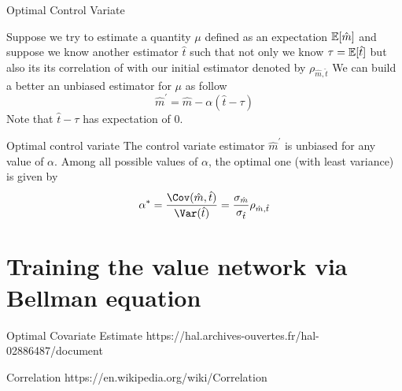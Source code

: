 \documentclass{article}
\begin{document}
Optimal Control Variate

Suppose we try to estimate a quantity $\mu$ defined as an expectation
$\mathbb{E}[\hat m]$ and suppose we know another estimator $\hat t$ such 
that not only we know $\tau = \mathbb{E}[\hat t]$ but also its its 
correlation of with our initial estimator denoted by $\rho_{\hat m, \hat t}$
We can build a better an unbiased estimator for $\mu$ as follow
\[
    \hat m ^{\prime} = \hat m - \alpha(\hat t - \tau)
\]
Note that $\hat t - \tau$ has expectation of 0. 

\begin{proposition}{Optimal control variate}
    The control variate estimator $\hat m ^{\prime}$ is unbiased for any
    value of $\alpha$. Among all possible values of $\alpha$, the optimal
    one (with least variance) is given by
    \[
        \alpha^* = \frac{\Cov(\hat m, \hat t)}{\Var(\hat t)} 
        = \frac{\sigma_{\hat m}}{\sigma_{\hat t}} \rho_{\hat m, \hat t}
    \]
\end{proposition}

\section{Training the value network via Bellman equation}



Optimal Covariate Estimate
https://hal.archives-ouvertes.fr/hal-02886487/document

Correlation
https://en.wikipedia.org/wiki/Correlation
\end{document}
